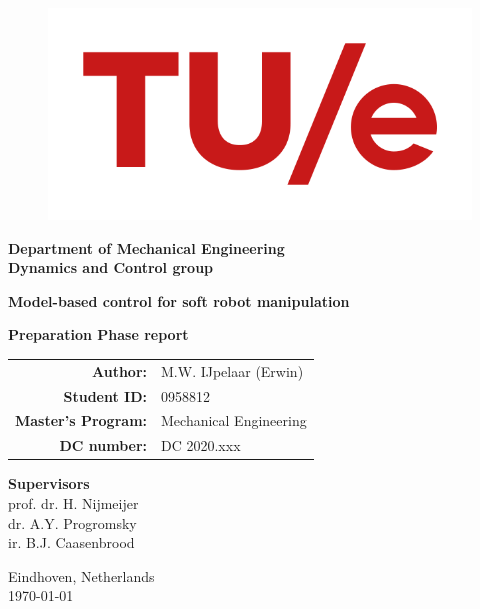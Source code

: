
\begin{titlepage}

          \begin{figure}[H]
                \centering
              \includegraphics[width=0.6\linewidth]{TitlePage/tue.png}
          \end{figure}

\begin{center}
\vspace*{5mm}


\large
    \textbf{Department of Mechanical Engineering} \\
    \textbf{Dynamics and Control group}

\vspace*{10mm}

    \huge
    \textbf{Model-based control for soft robot manipulation\\}
    
\vspace{15mm}
    \Large \textbf{Preparation Phase report} \\
    
\vspace*{2.6cm}
    
    \large
    \begin{tabular}{rl}
    \textbf{Author:}           & M.W. IJpelaar (Erwin)  \\
    \textbf{Student ID:}       & 0958812  \\
    \textbf{Master's Program:} & Mechanical Engineering \\
    \textbf{DC number:}        & DC 2020.xxx \\
    \end{tabular}

\vspace*{15mm}


        
    \large
 \textbf{Supervisors}   \\
      prof. dr. H. Nijmeijer   \\
      dr. A.Y. Progromsky  \\
      ir. B.J. Caasenbrood   \\

    \vspace*{2cm}
     \vspace{0.6cm}


	\begin{flushright}
		Eindhoven, Netherlands\\
		\today \\	
	\end{flushright}
	
\end{center}	
\end{titlepage}